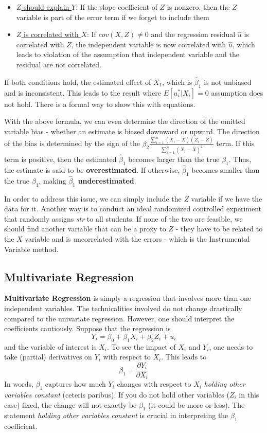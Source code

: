 \documentclass[12pt]{article}
\theoremstyle{definition}
\theoremstyle{property}
\theoremstyle{assumption}
\theoremstyle{example}
\theoremstyle{comment}
\begin{document}
\begin{itemize}
\item \underline{$Z$ should explain $Y$}: If the slope coefficient of $Z$ is nonzero, then the $Z$ variable is part of the error term if we forget to include them
\item \underline{$Z$ is correlated with $X$}: If $cov(X,Z)\neq0$ and the regression residual $\hat{u}$ is correlated with $Z$, the independent variable is now correlated with $\hat{u}$, which leads to violation of the assumption that independent variable and the residual are not correlated.
\end{itemize} \par\medskip
If both conditions hold, the estimated effect of $X_1$, which is $\hat{\beta}_1$ is not unbiased and is inconsistent. This leads to the result where $E[u^*_i|X_i]=0$ assumption does not hold. There is a formal way to show this with equations.
\par\medskip
With the above formula, we can even determine the direction of the omitted variable bias - whether an estimate is biased downward or upward. The direction of the bias is determined by the sign of the $\beta_2\frac{\sum_{i=1}^n(X_i-\bar{X})(Z_i-\bar{Z})}{\sum_{i=1}^n(X_i-\bar{X})^2}$ term. If this term is positive, then the estimated $\hat{\beta}_1$ becomes larger than the true $\beta_1$. Thus, the estimate is said to be \textbf{overestimated}. If otherwise, $\hat{\beta}_1$ becomes smaller than the true $\beta_1$, making $\hat{\beta}_1$ \textbf{underestimated}.
\par\medskip
In order to address this issue, we can simply include the $Z$ variable if we have the data for it. Another way is to conduct an ideal randomized controlled experiment that randomly assigns \textit{str} to all students. If none of the two are feasible, we should find another variable that can be a proxy to $Z$ - they have to be related to the $X$ variable and is uncorrelated with the errors - which is the Instrumental Variable method. \par\medskip

\subsection{Multivariate Regression}
\textbf{Multivariate Regression} is simply a regression that involves more than one independent variables. The technicalities involved do not change drastically compared to the univariate regression. However, one should interpret the coefficients cautiously. Suppose that the regression is
\[
Y_i = \beta_0 + \beta_1 X_i + \beta_2 Z_i+u_i
\]
and the variable of interest is $X_i$. To see the impact of $X_i$ and $Y_i$, one needs to take (partial) derivatives on $Y_i$ with respect to $X_i$. This leads to
\[
\beta_1 = \frac{\partial Y_i}{\partial X_i}
\]
In words, $\beta_1$ captures how much $Y_i$ changes with respect to $X_i$ \emph{holding other variables constant} (ceteris paribus). If you do not hold other variables ($Z_i$ in this case) fixed, the change will not exactly be $\beta_1$ (it could be more or less). The statement \emph{holding other variables constant} is crucial in interpreting the $\beta_1$ coefficient.
\par\medskip
\end{document}
